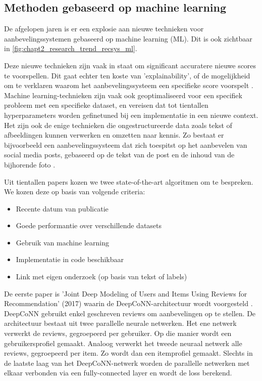 \subsection{Methoden gebaseerd op machine learning}
\label{sec:chapt2_machine_learning_modellen}
De afgelopen jaren is er een explosie aan nieuwe technieken voor aanbevelingssystemen gebaseerd op machine learning (ML). Dit is ook zichtbaar in \autoref{fig:chapt2_research_trend_recsys_ml}.


 Deze nieuwe technieken zijn vaak in staat om significant accuratere nieuwe scores te voorspellen. Dit gaat echter ten koste van 'explainability', of de mogelijkheid om te verklaren waarom het aanbevelingssysteem een specifieke score voorspelt \cite{overzicht_technieken}. Machine learning-technieken zijn vaak ook geoptimaliseerd voor een specifiek probleem met een specifieke dataset, en vereisen dat tot tientallen hyperparameters worden gefinetuned bij een implementatie in een nieuwe context. Het zijn ook de enige technieken die ongestructureerde data zoals tekst of afbeeldingen kunnen verwerken en omzetten naar kennis. Zo bestaat er bijvoorbeeld een aanbevelingssysteem dat zich toespitst op het aanbevelen van social media posts, gebaseerd op de tekst van de post en de inhoud van de bijhorende foto \cite{recsys_afbeeldingen_social_network}.

 Uit tientallen papers kozen we twee state-of-the-art algoritmen om te bespreken. We kozen deze op basis van volgende criteria:
\begin{itemize}
     \item Recente datum van publicatie
     \item Goede performantie over verschillende datasets
     \item Gebruik van machine learning
     \item Implementatie in code beschikbaar
     \item Link met eigen onderzoek (op basis van tekst of labels)
\end{itemize}

De eerste paper is 'Joint Deep Modeling of Users and Items Using Reviews for Recommendation' (2017) waarin de DeepCoNN-architectuur wordt voorgesteld \cite{deepconn}. DeepCoNN gebruikt enkel geschreven reviews om aanbevelingen op te stellen. De architectuur bestaat uit twee parallelle neurale netwerken. Het ene netwerk verwerkt de reviews, gegroepeerd per gebruiker. Op die manier wordt een gebruikersprofiel gemaakt. Analoog verwerkt het tweede neuraal netwerk alle reviews, gegroepeerd per item. Zo wordt dan een itemprofiel gemaakt. Slechts in de laatste laag van het DeepCoNN-netwerk worden de parallelle netwerken met elkaar verbonden via een fully-connected layer en wordt de loss berekend.

